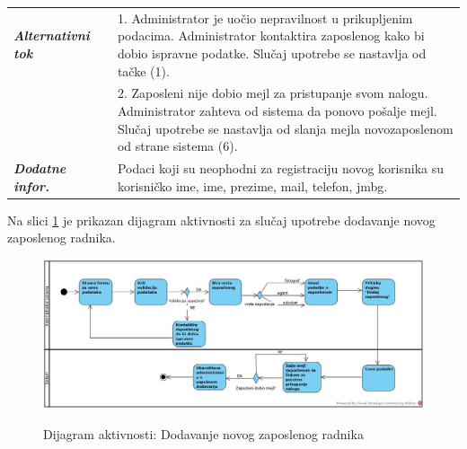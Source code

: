\documentclass[20pt]{article}
\begin{document}
\begin{center}
\begin{longtable}{p{0.23\linewidth} p{0.77\linewidth}}
 {\it \bfseries Alternativni tok} & 1. Administrator je uo\v {c}io nepravilnost u prikupljenim podacima. Administrator kontaktira zaposlenog kako bi dobio ispravne podatke. Slu\v {c}aj upotrebe se nastavlja od ta\v {c}ke (1).\\
 & 2. Zaposleni nije dobio mejl za pristupanje svom nalogu. Administrator zahteva od sistema da ponovo po\v {s}alje mejl. Slu\v {c}aj upotrebe se nastavlja od slanja mejla novozaposlenom od strane sistema (6).\\
 \hline
 {\it \bfseries Dodatne infor.} & Podaci koji su neophodni za registraciju novog korisnika su korisni\v {c}ko ime, ime, prezime, mail, telefon, jmbg.\\
 \hline
\end{longtable}
\end{center}
\newpage
Na slici \ref{fig:dijagramAktivnostiDodavanjaZaposlenog} je prikazan dijagram aktivnosti za slu\v{c}aj upotrebe dodavanje novog zaposlenog radnika.
\begin{figure}[h]
        \centering
        \includegraphics[width=1.1\textwidth,height=0.51\textheight]{Pictures/DodavanjeNovogZaposlenogRadnika.jpg}\\
        \caption{Dijagram aktivnosti: Dodavanje novog zaposlenog radnika}
        \label{fig:dijagramAktivnostiDodavanjaZaposlenog}
    \end{figure}


\newpage
{}
\setlength{\parindent}{1cm}
\fontsize{13}{18} \selectfont 
\end{document}
